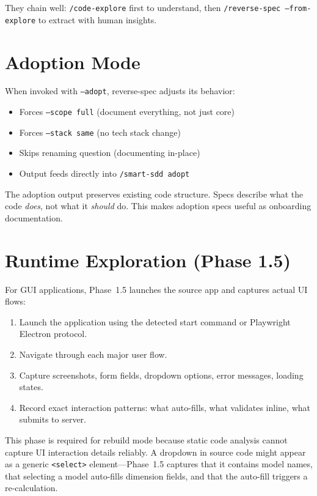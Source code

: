 \documentclass[11pt,a4paper,openright,twoside]{report}
\newcommand{\cmd}[1]{\texttt{/#1}}
\begin{document}
They chain well: \cmd{code-explore} first to understand, then \cmd{reverse-spec --from-explore} to extract with human insights.

\section{Adoption Mode}

When invoked with \texttt{--adopt}, reverse-spec adjusts its behavior:

\begin{itemize}
  \item Forces \texttt{--scope full} (document everything, not just core)
  \item Forces \texttt{--stack same} (no tech stack change)
  \item Skips renaming question (documenting in-place)
  \item Output feeds directly into \texttt{/smart-sdd adopt}
\end{itemize}

The adoption output preserves existing code structure. Specs describe what the code \emph{does}, not what it \emph{should} do. This makes adoption specs useful as onboarding documentation.

\section{Runtime Exploration (Phase 1.5)}

For GUI applications, Phase~1.5 launches the source app and captures actual UI flows:

\begin{enumerate}
  \item Launch the application using the detected start command or Playwright Electron protocol.
  \item Navigate through each major user flow.
  \item Capture screenshots, form fields, dropdown options, error messages, loading states.
  \item Record exact interaction patterns: what auto-fills, what validates inline, what submits to server.
\end{enumerate}

This phase is required for rebuild mode because static code analysis cannot capture UI interaction details reliably. A dropdown in source code might appear as a generic \texttt{<select>} element---Phase~1.5 captures that it contains model names, that selecting a model auto-fills dimension fields, and that the auto-fill triggers a re-calculation.
\end{document}
